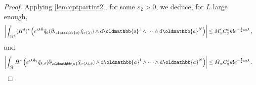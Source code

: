 \documentclass[
	fontsize=11pt, 
	twoside=false, 
	abstract=true, 
	a4paper,
]{scrartcl}
\newcommand{\eps}{\varepsilon}
\newcommand{\RR}{\mathbb{R}}
\newcommand{\dd}{\mathrm{d}}
\newcommand{\abs}[1]{\left\lvert#1\right\rvert}
\newcommand{\del}{\partial}
\newcommand{\td}[1]{\tilde{#1}}
\newcommand{\an}{\quad\text{and}\quad}
\newcommand{\id}{\mathrm{id}}
\newcommand{\mf}[1]{\oldmathbb{#1}}
\begin{document}
\begin{proof}
%
%
	Applying \cref{lem:cptpartint2}, for some $\eps_2 > 0$, we deduce, for $L$ large enough,
	\begin{equation}\label{eq:sto3decay}
		\abs{\int_{M^\delta} (H^\delta)^\ast\left(e^{i\lambda\td{\Phi}} \td{q}_{k}(\bar\del_{\mf{a}}\td{\chi}_{\tau(\lambda)}) \wedge \dd \mf{a}^1 \wedge \dots\wedge\dd \mf{a}^{N}\right)} \leq M_w' C_q^k k! e^{-\frac{1}{2}\eps_2\lambda}\,,
	\end{equation}
	and 
	\begin{equation}\label{eq:sto2decay}
		\abs{\int_{\td{M}} \td{H}^\ast\left(e^{i\lambda\td{\Phi}_\delta} \td{q}_{k,\delta}(\bar\del_{\mf{a}}\td{\chi}_{\tau(\lambda),\delta}) \wedge \dd \mf{a}^1 \wedge \dots\wedge\dd \mf{a}^{N}\right)} \leq \td{M}_w C_q^k k! e^{-\frac{1}{2}\eps_2\lambda}\,.
	\end{equation}
%
%
%
%

\end{proof}
\end{document}
